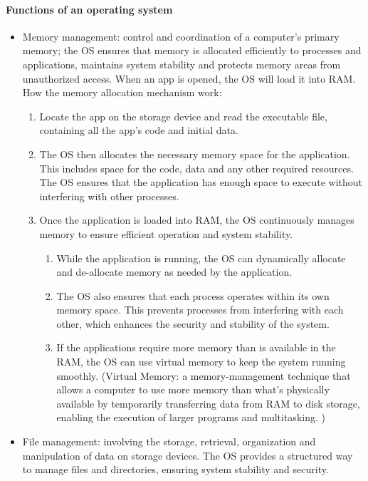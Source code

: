 \documentclass[a4paper,12pt]{article}
\begin{document}
\paragraph{Functions of an operating system}
\begin{itemize}
    \item Memory management: control and coordination of a computer's primary memory; the OS ensures that memory is allocated efficiently to processes and applications, maintains system stability and protects memory areas from unauthorized access. When an app is opened, the OS will load it into RAM. How the memory allocation mechanism work:
    \begin{enumerate}
        \item Locate the app on the storage device and read the executable file, containing all the app's code and initial data. 
        \item The OS then allocates the necessary memory space for the application. This includes space for the code, data and any other required resources. The OS ensures that the application has enough space to execute without interfering with other processes. 
        \item Once the application is loaded into RAM, the OS continuously manages memory to ensure efficient operation and system stability.
        \begin{enumerate}
            \item While the application is running, the OS can dynamically allocate and de-allocate memory as needed by the application. 
            \item The OS also ensures that 
each process operates within its own memory space. This prevents processes from interfering with each other, which enhances the security and stability of the system. 
\item If the applications require more memory than is available in the RAM, the OS can use virtual memory to keep the system running smoothly. (Virtual Memory: a memory-management technique that allows a computer to use more memory than what's physically available by temporarily transferring data from RAM to disk storage, enabling the execution of larger programs and multitasking. )
            \end{enumerate}
    \end{enumerate}
    \item File management: involving the storage, retrieval, organization and manipulation of data on storage devices. The OS provides a structured way to manage files and directories, ensuring system stability and security. 

\end{itemize}
\end{document}

